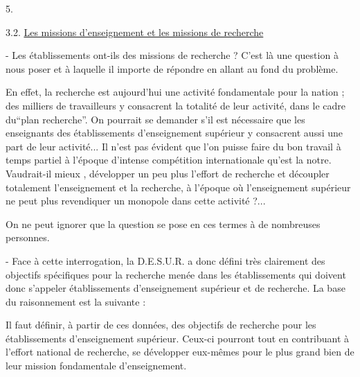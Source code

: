 
\begin{flushright}5.\end{flushright}

3.2. \uline{Les missions d'enseignement et les missions de recherche}

- Les établissements ont-ils des missions de recherche ? C'est là une question à nous poser et à laquelle il importe de répondre en allant au fond du problème.

En effet, la recherche est aujourd'hui une activité fondamentale pour la nation ; des milliers de travailleurs y consacrent la totalité de leur activité, dans le cadre du``plan recherche''. On pourrait se demander s'il est nécessaire que les enseignants des établissements d'enseignement supérieur y consacrent aussi une part de leur activité... Il n'est pas évident que l'on puisse faire du bon travail à temps partiel à l'époque d'intense compétition internationale qu'est la notre. Vaudrait-il mieux , développer un peu plus l'effort de recherche et découpler totalement l'enseignement et la recherche, à l'époque où l'enseignement supérieur ne peut plus revendiquer un monopole dans cette activité ?...

On ne peut ignorer que la question se pose en ces termes à de nombreuses personnes.

- Face à cette interrogation, la D.E.S.U.R. a donc défini très clairement des objectifs spécifiques pour la recherche menée dans les établissements qui doivent donc s'appeler établissements d'enseignement supérieur et de recherche. La base du raisonnement est la suivante :


Il faut définir, à partir de ces données, des objectifs de recherche pour les établissements d'enseignement supérieur. Ceux-ci pourront tout en contribuant à l'effort national de recherche, se développer eux-mêmes pour le plus grand bien de leur mission fondamentale d'enseignement.

